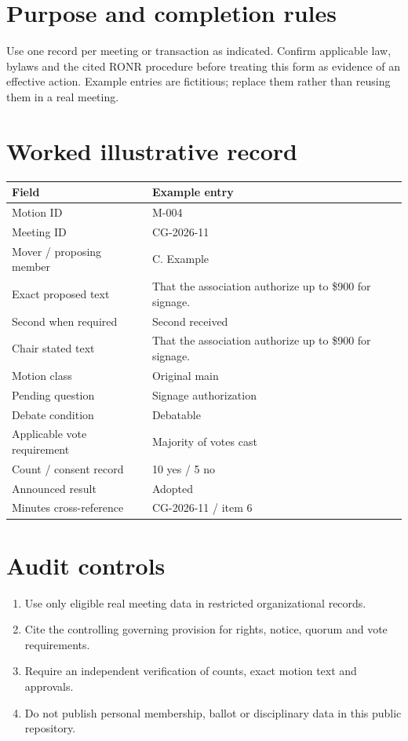 \documentclass[11pt]{article}
\begin{document}
\SuiteOpen
\section{Purpose and completion rules}
Use one record per meeting or transaction as indicated. Confirm applicable law, bylaws and the cited RONR procedure before treating this form as evidence of an effective action. Example entries are fictitious; replace them rather than reusing them in a real meeting.

\section{Worked illustrative record}
\begin{longtable}{@{}p{.38\linewidth}p{.55\linewidth}@{}}\toprule Field & Example entry\\\midrule\endhead


Motion ID & M-004\\
Meeting ID & CG-2026-11\\
Mover / proposing member & C. Example\\
Exact proposed text & That the association authorize up to \$900 for signage.\\
Second when required & Second received\\
Chair stated text & That the association authorize up to \$900 for signage.\\
Motion class & Original main\\
Pending question & Signage authorization\\
Debate condition & Debatable\\
Applicable vote requirement & Majority of votes cast\\
Count / consent record & 10 yes / 5 no\\
Announced result & Adopted\\
Minutes cross-reference & CG-2026-11 / item 6\\
\bottomrule\end{longtable}
\section{Audit controls}
\begin{enumerate}[leftmargin=*,itemsep=4pt]
\item Use only eligible real meeting data in restricted organizational records.
\item Cite the controlling governing provision for rights, notice, quorum and vote requirements.
\item Require an independent verification of counts, exact motion text and approvals.
\item Do not publish personal membership, ballot or disciplinary data in this public repository.
\end{enumerate}
\end{document}

